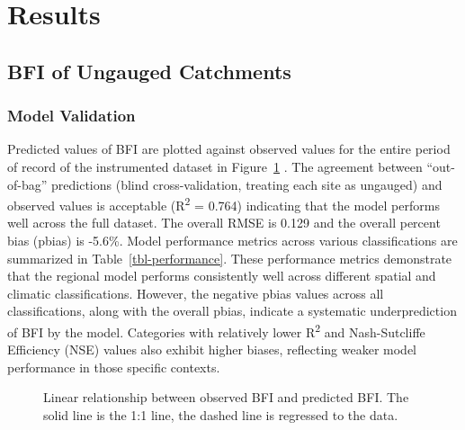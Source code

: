 \documentclass[
]{agujournal2019}
\begin{document}
\section{Results}\label{results}

\subsection{BFI of Ungauged
Catchments}\label{bfi-of-ungauged-catchments}

\subsubsection{Model Validation}\label{model-validation}

Predicted values of BFI are plotted against observed values for the
entire period of record of the instrumented dataset in
Figure~\ref{fig-actual_predicted} . The agreement between ``out-of-bag''
predictions (blind cross-validation, treating each site as ungauged) and
observed values is acceptable (R\textsuperscript{2} = 0.764) indicating
that the model performs well across the full dataset. The overall RMSE
is 0.129 and the overall percent bias (pbias) is -5.6\%. Model
performance metrics across various classifications are summarized in
Table~\ref{tbl-performance}. These performance metrics demonstrate that
the regional model performs consistently well across different spatial
and climatic classifications. However, the negative pbias values across
all classifications, along with the overall pbias, indicate a systematic
underprediction of BFI by the model. Categories with relatively lower
R\textsuperscript{2} and Nash-Sutcliffe Efficiency (NSE) values also
exhibit higher biases, reflecting weaker model performance in those
specific contexts.

\begin{figure}


\caption{\label{fig-actual_predicted}Linear relationship between
observed BFI and predicted BFI. The solid line is the 1:1 line, the
dashed line is regressed to the data.}

\end{figure}%
\end{document}
